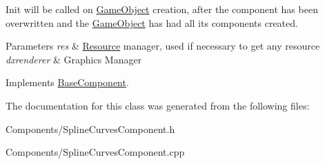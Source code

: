 Init will be called on \hyperlink{classGameObject}{Game\+Object} creation, after the component has been overwritten and the \hyperlink{classGameObject}{Game\+Object} has had all its components created. 


\begin{DoxyParams}{Parameters}
{\em res} & \hyperlink{structResource}{Resource} manager, used if necessary to get any resource \\
\hline
{\em dxrenderer} & Graphic\textquotesingle{}s Manager \\
\hline
\end{DoxyParams}


Implements \hyperlink{classBaseComponent}{Base\+Component}.



The documentation for this class was generated from the following files\+:\begin{DoxyCompactItemize}
\item 
Components/Spline\+Curves\+Component.\+h\item 
Components/Spline\+Curves\+Component.\+cpp\end{DoxyCompactItemize}
